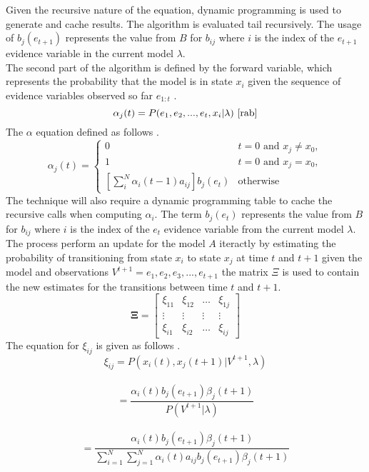 \documentclass[11pt]{article}
\begin{document}
Given the recursive nature of the equation, dynamic programming is used to generate and cache results. The algorithm is evaluated tail recursively. The usage of $b_j(e_{t+1})$ represents the value from $B$ for $b_{ij}$ where $i$ is the index of the $e_{t+1}$ evidence variable in the current model $\lambda$.\\
The second part of the algorithm is defined by the forward variable, which represents the probability that the model is in state $x_i$ given the sequence of evidence variables observed so far $e_{1:t}$ \cite{pc}.
$$
\alpha_j(t) = P(e_1,e_2,...,e_t, x_i | \lambda) \text{ \cite{rab}}
$$
The $\alpha$ equation defined as follows \cite{pc}.
\begin{equation*}
\alpha_j(t) = \left\{
    \begin{array}{rl}
    0 & t = 0 \text{ and } x_j \neq x_0,\\
    1 & t = 0 \text{ and } x_j = x_0, \\
    \left[ \sum_i^N \alpha_i(t-1)a_{ij}\right]b_j(e_t) & \text{otherwise} 
    \end{array}
\right.
\end{equation*}
The technique will also require a dynamic programming table to cache the recursive calls when computing $\alpha_i$. The term $b_j(e_t)$ represents the value from $B$ for $b_{ij}$ where $i$ is the index of the $e_t$ evidence variable from the current model $\lambda$.\\
The process perform an update for the model $A$ iteractly by estimating the probability of transitioning from state $x_i$ to state $x_j$ at time $t$ and $t+1$ given the model and observations $V^{t+1} = e_1,e_2, e_3,...,e_{t+1}$ \cite{rab} the matrix $\Xi$ is used to contain the new estimates for the transitions between time $t$ and $t+1$.
\begin{equation*}
 \mathbf{\Xi} = \left[
    \begin{array}{cccc}
    \xi_{11} & \xi_{12} & \ldots & \xi_{1j} \\
    \vdots & \vdots & \vdots & \vdots \\
    \xi_{i1} & \xi_{i2} & \ldots & \xi_{ij}
    \end{array}
    \right]
\end{equation*}
The equation for $\xi_{ij}$ is given as follows \cite{rab}.
$$
\xi_{ij} = P(x_i(t), x_j(t+1) | V^{t+1}, \lambda) 
$$\\
$$
= \frac{\alpha_i(t)b_j(e_{t+1})\beta_j(t+1)}{P(V^{t+1}|\lambda)} 
$$\\
$$
= \frac{\alpha_i(t)b_j(e_{t+1})\beta_j(t+1)}{\sum_{i=1}^N \sum_{j=1}^N \alpha_i(t) a_{ij}b_j(e_{t+1})\beta_j(t+1)}
$$
\end{document}
